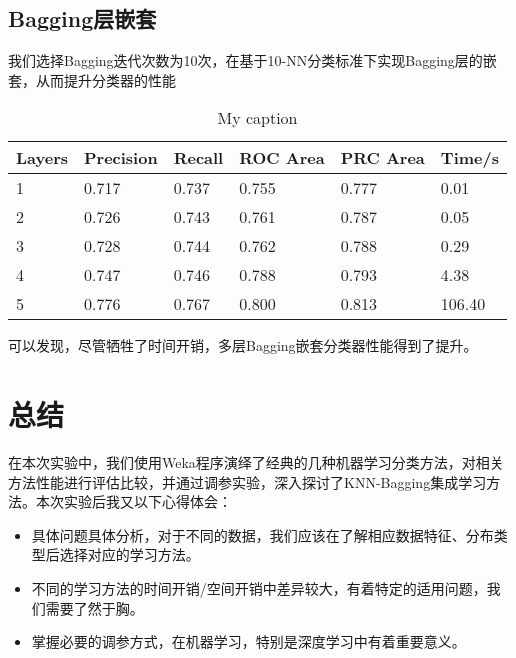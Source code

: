 \documentclass[a4paper,UTF8]{article}
\numberwithin{equation}{section}
\begin{document}
\subsection{Bagging层嵌套}
我们选择Bagging迭代次数为10次，在基于10-NN分类标准下实现Bagging层的嵌套，从而提升分类器的性能
\begin{table}[H]
\centering
\caption{My caption}
\label{my-label}
\begin{tabular}{l|lllll}
\hline
Layers & Precision & Recall & ROC Area & PRC Area & Time/s \\ \hline
1      & 0.717     & 0.737  & 0.755    & 0.777    & 0.01   \\ \hline
2      & 0.726     & 0.743  & 0.761    & 0.787    & 0.05   \\ \hline
3      & 0.728     & 0.744  & 0.762    & 0.788    & 0.29   \\ \hline
4      & 0.747     & 0.746  & 0.788    & 0.793    & 4.38   \\ \hline
5      & 0.776     & 0.767  & 0.800    & 0.813    & 106.40 \\ \hline
\end{tabular}
\end{table}
可以发现，尽管牺牲了时间开销，多层Bagging嵌套分类器性能得到了提升。

\section{总结}
在本次实验中，我们使用Weka程序演绎了经典的几种机器学习分类方法，对相关方法性能进行评估比较，并通过调参实验，深入探讨了KNN-Bagging集成学习方法。本次实验后我又以下心得体会：
\begin{itemize}
\item 具体问题具体分析，对于不同的数据，我们应该在了解相应数据特征、分布类型后选择对应的学习方法。
\item 不同的学习方法的时间开销/空间开销中差异较大，有着特定的适用问题，我们需要了然于胸。
\item 掌握必要的调参方式，在机器学习，特别是深度学习中有着重要意义。
\end{itemize}
\end{document}
